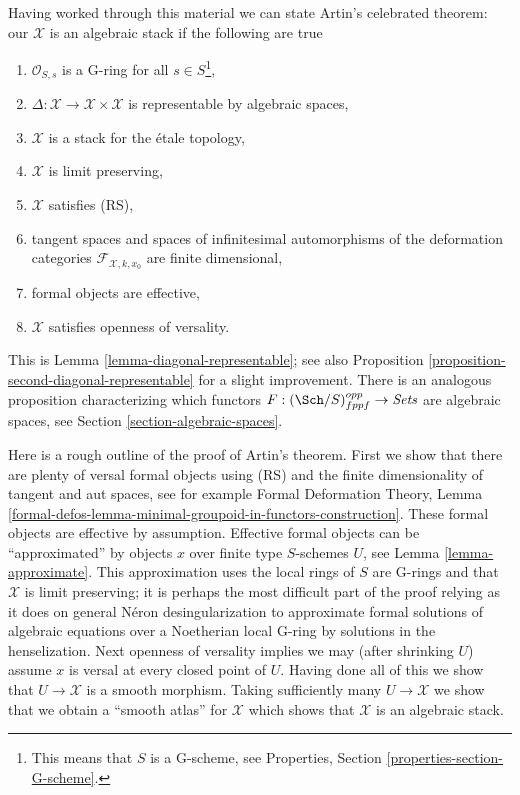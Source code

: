 \medskip\noindent
Having worked through this material we can state Artin's celebrated
theorem: our $\mathcal{X}$ is an algebraic stack if the following are true
\begin{enumerate}
\item $\mathcal{O}_{S, s}$ is a G-ring for all $s \in S$\footnote{This
means that $S$ is a G-scheme, see
Properties, Section \ref{properties-section-G-scheme}.},
\item $\Delta : \mathcal{X} \to \mathcal{X} \times \mathcal{X}$
is representable by algebraic spaces,
\item $\mathcal{X}$ is a stack for the \'etale topology,
\item $\mathcal{X}$ is limit preserving,
\item $\mathcal{X}$ satisfies (RS),
\item tangent spaces and spaces of infinitesimal automorphisms
of the deformation categories $\mathcal{F}_{\mathcal{X}, k, x_0}$
are finite dimensional,
\item formal objects are effective,
\item $\mathcal{X}$ satisfies openness of versality.
\end{enumerate}
This is Lemma \ref{lemma-diagonal-representable}; see also
Proposition \ref{proposition-second-diagonal-representable}
for a slight improvement. There is an analogous proposition
characterizing which functors $F : (\Sch/S)_{fppf}^{opp} \to \textit{Sets}$
are algebraic spaces, see Section \ref{section-algebraic-spaces}.

\medskip\noindent
Here is a rough outline of the proof of Artin's theorem.
First we show that there are plenty of versal formal objects
using (RS) and the finite dimensionality of tangent and aut spaces, see
for example Formal Deformation Theory, Lemma
\ref{formal-defos-lemma-minimal-groupoid-in-functors-construction}.
These formal objects are effective by assumption.
Effective formal objects can be ``approximated'' by objects $x$ over
finite type $S$-schemes $U$, see Lemma \ref{lemma-approximate}.
This approximation uses the local rings of $S$ are G-rings and
that $\mathcal{X}$ is limit preserving; it is perhaps the most difficult
part of the proof relying as it does on general N\'eron desingularization to
approximate formal solutions of algebraic equations over a Noetherian local
G-ring by solutions in the henselization.
Next openness of versality implies we may (after shrinking $U$)
assume $x$ is versal at every closed point of $U$.
Having done all of this we show that $U \to \mathcal{X}$
is a smooth morphism. Taking sufficiently many $U \to \mathcal{X}$
we show that we obtain a ``smooth atlas'' for $\mathcal{X}$ which shows
that $\mathcal{X}$ is an algebraic stack.

